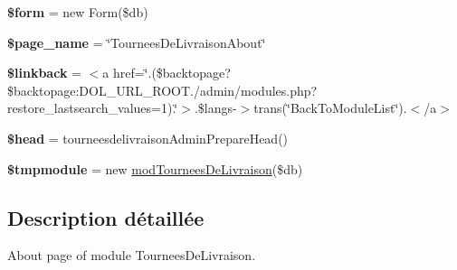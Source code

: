 \begin{DoxyCompactItemize}
\mbox{\label{about_8php_a1a4fda4c28a9ee5f91102c023b9501f4}} 
{\bfseries \$form} = new Form(\$db)
\item 
\mbox{\label{about_8php_adc3f16c3b03bc755ab09d40e79211d08}} 
{\bfseries \$page\+\_\+name} = \char`\"{}Tournees\+De\+Livraison\+About\char`\"{}
\item 
\mbox{\label{about_8php_aa8a538bac04922850b15c7460fb1bfc7}} 
{\bfseries \$linkback} = \textquotesingle{}$<$a href=\char`\"{}\textquotesingle{}.(\$backtopage?\$backtopage\+:\+D\+O\+L\+\_\+\+U\+R\+L\+\_\+\+R\+O\+O\+T.\textquotesingle{}/admin/modules.\+php?restore\+\_\+lastsearch\+\_\+values=1\textquotesingle{}).\textquotesingle{}\char`\"{}$>$\textquotesingle{}.\$langs-\/$>$trans(\char`\"{}Back\+To\+Module\+List\char`\"{}).\textquotesingle{}$<$/a$>$\textquotesingle{}
\item 
\mbox{\label{about_8php_a687ea7fcd78263867b5bd34ed56b6379}} 
{\bfseries \$head} = tourneesdelivraison\+Admin\+Prepare\+Head()
\item 
\mbox{\label{about_8php_a2b7b465d78d9b8379a9ec8070a5c4bb3}} 
{\bfseries \$tmpmodule} = new \hyperlink{classmodTourneesDeLivraison}{mod\+Tournees\+De\+Livraison}(\$db)
\end{DoxyCompactItemize}


\subsection{Description détaillée}
About page of module Tournees\+De\+Livraison. 


